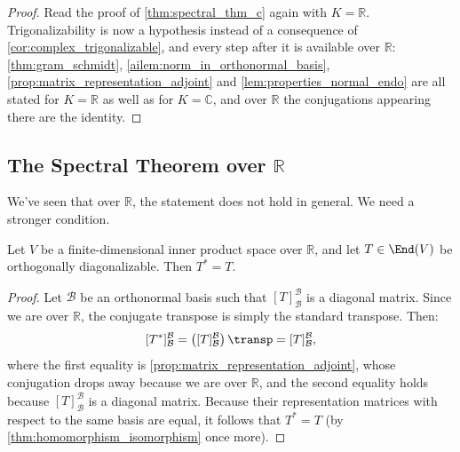 \begin{proof}
Read the proof of \cref{thm:spectral_thm_c} again with $K = \mathbb{R}$. Trigonalizability is now a hypothesis instead of a consequence of \cref{cor:complex_trigonalizable}, and every step after it is available over $\mathbb{R}$: \cref{thm:gram_schmidt}, \cref{ailem:norm_in_orthonormal_basis}, \cref{prop:matrix_representation_adjoint} and \cref{lem:properties_normal_endo} are all stated for $K = \mathbb{R}$ as well as for $K = \mathbb{C}$, and over $\mathbb{R}$ the conjugations appearing there are the identity.
\end{proof}

\subsection{The Spectral Theorem over \texorpdfstring{$\mathbb{R}$}{R}}

We've seen that over $\mathbb{R}$, the statement  does not hold in general. We need a stronger condition.

\begin{lemma}
\label{lem:real_orth_diag_is_self_adj}
Let $V$ be a finite-di\-men\-sional inner product space over $\mathbb{R}$, and let $T \in \End(V)$ be orthogonally diagonalizable. Then $T^* = T$.
\end{lemma}

\begin{proof}
Let $\mathcal{B}$ be an orthonormal basis such that $[T]_{\mathcal{B}}^{\mathcal{B}}$ is a diagonal matrix. Since we are over $\mathbb{R}$, the conjugate transpose is simply the standard transpose. Then:
\[
    [T^*]_{\mathcal{B}}^{\mathcal{B}} = \left([T]_{\mathcal{B}}^{\mathcal{B}}\right)\transp = [T]_{\mathcal{B}}^{\mathcal{B}},
\]
where the first equality is \cref{prop:matrix_representation_adjoint}, whose conjugation drops away because we are over $\mathbb{R}$, and the second equality holds because $[T]_{\mathcal{B}}^{\mathcal{B}}$ is a diagonal matrix. Because their representation matrices with respect to the same basis are equal, it follows that $T^* = T$ (by \cref{thm:homomorphism_isomorphism} once more).
\end{proof}

